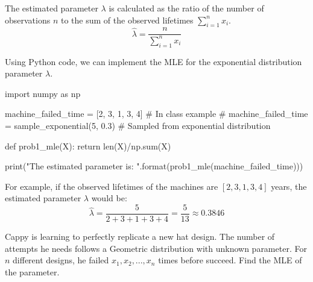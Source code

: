 \documentclass[a4paper, 10pt]{article}
\begin{document}
\begin{solution}
The estimated parameter \( \lambda \) is calculated as the ratio of the number of observations \( n \) to the sum of the observed lifetimes \( \sum_{i=1}^{n} x_i \).
\[
    \hat{\lambda} = \frac{n}{\sum_{i=1}^{n} x_i}
\]

Using Python code, we can implement the MLE for the exponential distribution parameter \( \lambda \).
\begin{codingbox}
import numpy as np

machine_failed_time = [2, 3, 1, 3, 4]   # In class example
# machine_failed_time = sample_exponential(5, 0.3)  # Sampled from exponential distribution

def prob1_mle(X):
  return len(X)/np.sum(X)

print("The estimated parameter is: {}".format(prob1_mle(machine_failed_time)))
\end{codingbox}

For example, if the observed lifetimes of the machines are \( [2, 3, 1, 3, 4] \) years, the estimated parameter \( \lambda \) would be:
\[
    \hat{\lambda} = \frac{5}{2 + 3 + 1 + 3 + 4} = \frac{5}{13} \approx 0.3846
\]
\end{solution}

\newpage

\begin{problem}
Cappy is learning to perfectly replicate a new hat design.
The number of attempts he needs follows a Geometric distribution with unknown parameter.
For \( n \) different designs, he failed \( x_1, x_2, ..., x_n \) times before succeed.
Find the MLE of the parameter.
\end{problem}
\end{document}
